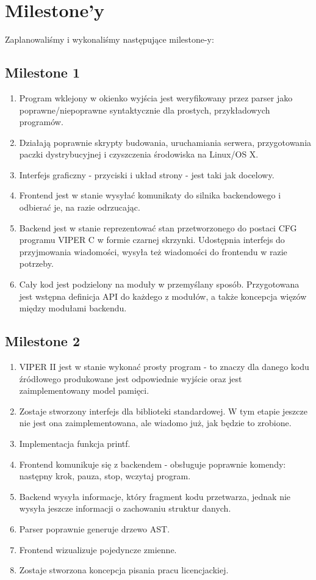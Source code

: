 \documentclass[a4paper,twoside,openright,11pt]{report}
\begin{document}
  \section {Milestone'y}
\par Zaplanowaliśmy i wykonaliśmy następujące milestone-y:
  \subsection {Milestone 1}
  \begin {enumerate}
    \item Program wklejony w okienko wyjścia jest weryfikowany przez parser jako poprawne/niepoprawne syntaktycznie dla prostych, przykładowych programów.
    \item Działają poprawnie skrypty budowania, uruchamiania serwera, przygotowania paczki dystrybucyjnej i czyszczenia środowiska na Linux/OS X.
    \item Interfejs graficzny - przyciski i układ strony - jest taki jak docelowy. 
    \item Frontend jest w stanie wysyłać komunikaty do silnika backendowego i odbierać je, na razie odrzucając.
    \item Backend jest w stanie reprezentować stan przetworzonego do postaci CFG  programu VIPER C w formie czarnej skrzynki. Udostępnia interfejs do przyjmowania wiadomości, wysyła też wiadomości do frontendu w razie potrzeby.
    \item Cały kod jest podzielony na moduły w przemyślany sposób.
Przygotowana jest wstępna definicja API do każdego z modułów, a także koncepcja więzów między modułami backendu.
  \end {enumerate}
  \subsection {Milestone 2}
  \begin {enumerate}
    \item VIPER II jest w stanie wykonać prosty program - to znaczy dla danego kodu źródłowego produkowane jest odpowiednie wyjście oraz jest zaimplementowany model pamięci.
    \item Zostaje stworzony interfejs dla biblioteki standardowej. W tym etapie jeszcze nie jest ona zaimplementowana, ale wiadomo już, jak będzie to zrobione. 
    \item Implementacja funkcja printf.
    \item Frontend komunikuje się z backendem - obsługuje poprawnie komendy: następny krok, pauza, stop, wczytaj program. 
    \item Backend wysyła informacje, który fragment kodu przetwarza, jednak nie wysyła jeszcze informacji o zachowaniu struktur danych.
    \item Parser poprawnie generuje drzewo AST.
    \item Frontend wizualizuje pojedyncze zmienne.
    \item Zostaje stworzona koncepcja pisania pracu licencjackiej.
  \end {enumerate}
\end{document}
